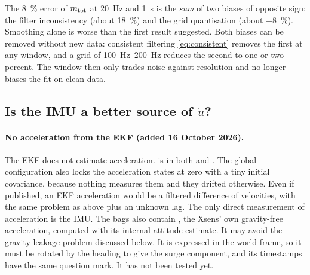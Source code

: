 \begin{keyidea}
The \qty{8}{\percent} error of $m_\mathrm{tot}$ at \qty{20}{\hertz} and \qty{1}{\second} is the
\emph{sum} of two biases of opposite sign: the filter inconsistency (about
\qty{+18}{\percent}) and the grid quantisation (about \qty{-8}{\percent}). Smoothing alone is
worse than the first result suggested. Both biases can be removed without new data: consistent
filtering \eqref{eq:consistent} removes the first at any window, and a grid of
\qtyrange{100}{200}{\hertz} reduces the second to one or two percent. The window then only trades
noise against resolution and no longer biases the fit on clean data.
\end{keyidea}

\subsection{Is the IMU a better source of \texorpdfstring{$\dot u$}{du/dt}?}

\paragraph{No acceleration from the EKF (added 16 October 2026).} The EKF does not estimate
acceleration.  is  in both  and
. The global configuration also locks the acceleration states at zero
with a tiny initial covariance, because nothing measures them and they drifted otherwise. Even
if published, an EKF acceleration would be a filtered difference of velocities, with the same
problem as above plus an unknown lag. The only direct measurement of acceleration is the IMU.
The bags also contain , the Xsens' own gravity-free
acceleration, computed with its internal attitude estimate. It may avoid the gravity-leakage
problem discussed below. It is expressed in the world frame, so it must be rotated by the heading
to give the surge component, and its timestamps have the same question mark. It has not been
tested yet.

